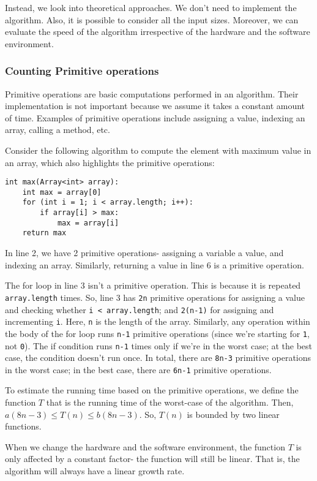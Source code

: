 \documentclass[a4paper, openany]{memoir}
\begin{document}
\noindent Instead, we look into theoretical approaches. We don't need to implement the algorithm. Also, it is possible to consider all the input sizes. Moreover, we can evaluate the speed of the algorithm irrespective of the hardware and the software environment.

\subsubsection{Counting Primitive operations}
Primitive operations are basic computations performed in an algorithm. Their implementation is not important because we assume it takes a constant amount of time. Examples of primitive operations include assigning a value, indexing an array, calling a method, etc.

\noindent Consider the following algorithm to compute the element with maximum value in an array, which also highlights the primitive operations:
\begin{lstlisting}[language=pseudocode]
int max(Array<int> array):
    int max = array[0]
    for (int i = 1; i < array.length; i++):
        if array[i] > max:
            max = array[i]
    return max
\end{lstlisting}
In line 2, we have 2 primitive operations- assigning a variable a value, and indexing an array. Similarly, returning a value in line 6 is a primitive operation.

\noindent The for loop in line 3 isn't a primitive operation. This is because it is repeated \texttt{array.length} times. So, line 3 has \texttt{2n} primitive operations for assigning a value and checking whether \texttt{i < array.length}; and \texttt{2(n-1)} for assigning and incrementing \texttt{i}. Here, \texttt{n} is the length of the array. Similarly, any operation within the body of the for loop runs \texttt{n-1} primitive operations (since we're starting for \texttt{1}, not \texttt{0}). The if condition runs \texttt{n-1} times only if we're in the worst case; at the best case, the condition doesn't run once. In total, there are \texttt{8n-3} primitive operations in the worst case; in the best case, there are \texttt{6n-1} primitive operations.

\noindent To estimate the running time based on the primitive operations, we define the function $T$ that is the running time of the worst-case of the algorithm. Then, $a(8n - 3) \leq T(n) \leq b(8n-3)$. So, $T(n)$ is bounded by two linear functions.

\noindent When we change the hardware and the software environment, the function $T$ is only affected by a constant factor- the function will still be linear. That is, the algorithm will always have a linear growth rate.
\end{document}
